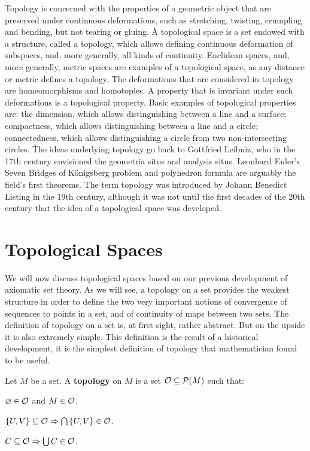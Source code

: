 Topology is concerned with the properties of a geometric object that are preserved under continuous deformations,
such as stretching, twisting, crumpling and bending, but not tearing or gluing. \v

A topological space is a set endowed with a structure, called a topology, which allows defining continuous
deformation of subspaces, and, more generally, all kinds of continuity. Euclidean spaces, and, more generally, metric
spaces are examples of a topological space, as any distance or metric defines a topology. The deformations that are
considered in topology are homeomorphisms and homotopies. A property that is invariant under such deformations is a
topological property. Basic examples of topological properties are: the dimension, which allows distinguishing
between a line and a surface; compactness, which allows distinguishing between a line and a circle; connectedness,
which allows distinguishing a circle from two non-intersecting circles. \v

The ideas underlying topology go back to Gottfried Leibniz, who in the 17th century envisioned the geometria situs
and analysis situs. Leonhard Euler's Seven Bridges of Königsberg problem and polyhedron formula are arguably the
field's first theorems. The term topology was introduced by Johann Benedict Listing in the 19th century, although it
was not until the first decades of the 20th century that the idea of a topological space was developed.

\section{Topological Spaces}

We will now discuss topological spaces based on our previous development of axiomatic set theory. As we will see, a
topology on a set provides the weakest structure in order to define the two very important notions of convergence of
sequences to points in a set, and of continuity of maps between two sets. The definition of topology on a set is, at
first sight, rather abstract. But on the upside it is also extremely simple. This definition is the result of a
historical development, it is the simplest definition of topology that mathematician found to be useful.

\bd [Topology]
Let $M$ be a set. A \textbf{topology} on $M$ is a set $\mathcal{O} \subseteq \mathcal{P}(M)$ such that:
\ben
\item[i)] $\varnothing \in \mathcal{O}$ and $M \in \mathcal{O}$.
\item[ii)] $\{U,V\}\subseteq \mathcal{O} \Rightarrow \bigcap\, \{U,V\} \in \mathcal{O}$.
\item[iii)] $C \subseteq \mathcal{O} \Rightarrow \bigcup C \in \mathcal{O}$.
\een
\ed

